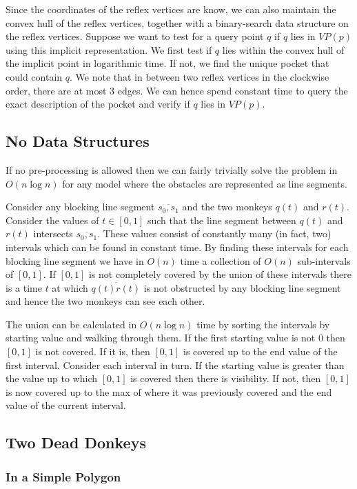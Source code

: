 \documentclass{article}
\begin{document}
Since the coordinates of the reflex vertices are know, we can also maintain the convex hull of the reflex vertices, together with a binary-search data structure on the reflex vertices. Suppose we want to test for a query point $q$ if $q$ lies in $VP(p)$ using this implicit representation. We first test if $q$ lies within the convex hull of the implicit point in logarithmic time. If not, we find the unique pocket that could contain $q$. We note that in between two reflex vertices in the clockwise order, there are at most 3 edges. We can hence spend constant time to query the exact description of the pocket and verify if $q$ lies in $VP(p)$.

\subsection{No Data Structures}
If no pre-processing is allowed then we can fairly trivially solve the problem in $O(n \log n)$ for any model where the obstacles are represented as line segments.

Consider any blocking line segment $\overline{s_0, s_1}$ and the two monkeys $q(t)$ and $r(t)$. Consider the values of $t \in [0, 1]$ such that the line segment between $q(t)$ and $r(t)$ intersects $\overline{s_0, s_1}$. These values consist of constantly many (in fact, two) intervals which can be found in constant time. By finding these intervals for each blocking line segment we have in $O(n)$ time a collection of $O(n)$ sub-intervals of $[0, 1]$. If $[0, 1]$ is not completely covered by the union of these intervals there is a time $t$ at which $\overline{q(t) r(t)}$ is not obstructed by any blocking line segment and hence the two monkeys can see each other.

The union can be calculated in $O(n \log n)$ time by sorting the intervals by starting value and walking through them. If the first starting value is not $0$ then $[0, 1]$ is not covered. If it is, then $[0, 1]$ is covered up to the end value of the first interval. Consider each interval in turn. If the starting value is greater than the value up to which $[0,1]$ is covered then there is visibility. If not, then $[0,1]$ is now covered up to the max of where it was previously covered and the end value of the current interval.

\subsection{Two Dead Donkeys}
\subsubsection{In a Simple Polygon}
\end{document}
